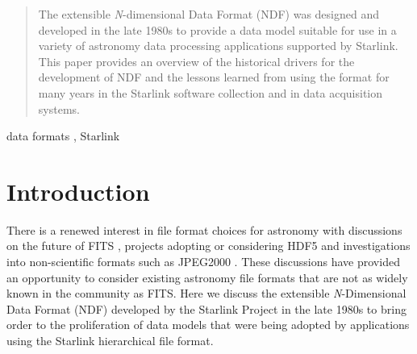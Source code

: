 \documentclass[final,authoryear,5p,times,twocolumn]{elsarticle}
\begin{document}
\begin{frontmatter}
\begin{abstract}

The extensible \emph{N}-dimensional Data Format (NDF) was designed and
developed in the late 1980s to provide a data model suitable for use
in a variety of astronomy data processing applications supported by
Starlink. This paper provides an overview of the historical drivers
for the development of NDF and the lessons learned from using the
format for many years in the Starlink software collection and in data
acquisition systems.

\end{abstract}

\begin{keyword}


data formats \sep
Starlink

\end{keyword}

\end{frontmatter}


\newcommand{\mnras}{Mon Not R Astron Soc}
\newcommand{\aap}{Astron Astrophys}
\newcommand{\aaps}{Astron Astrophys Supp}
\newcommand{\pasp}{Pub Astron Soc Pacific}
\newcommand{\apj}{Astrophys J}
\newcommand{\apjs}{Astrophys J Supp}
\newcommand{\qjras}{Quart J R Astron Soc}
\newcommand{\an}{Astron.\ Nach.}
\newcommand{\ijimw}{Int.\ J.\ Infrared \& Millimeter Waves}
\newcommand{\procspie}{Proc.\ SPIE}
\newcommand{\aspconf}{ASP Conf. Ser.}


\newcommand{\KAPPA}{\textsc{kappa}}
\newcommand{\gaia}{\textsc{gaia}}
\newcommand{\ccdpack}{\textsc{ccdpack}}
\newcommand{\smurf}{\textsc{smurf}}
\newcommand{\asterix}{\textsc{asterix}}
\newcommand{\specdre}{\textsc{specdre}}
\newcommand{\iras}{\textsc{iras90}}
\newcommand{\treeview}{\textsc{treeview}}
\newcommand{\splat}{\textsc{splat}}

\section{Introduction}
\label{sec:intro}

There is a renewed interest in file format choices for astronomy
with discussions on the future of FITS
\citep{P90_adassxxiii,2014Thomas}, projects adopting or considering
HDF5 \citep{2012ASPC..461..283A,P10_adassxxiii} and investigations into
non-scientific formats such as JPEG2000 \citep{2014Kitaeff}. These
discussions have provided an opportunity to consider existing
astronomy file formats that are not as widely known in the community
as FITS. Here we discuss the extensible \emph{N}-Dimensional
Data Format (NDF) developed by the Starlink Project
\citep{1982MmSAI..53...55T,2000ASSL..250...93W} in the late 1980s
\citep{1988STARB...2...11C,SGP38} to bring order to the proliferation
of data models that were being adopted by applications using the Starlink
hierarchical file format.
\end{document}

